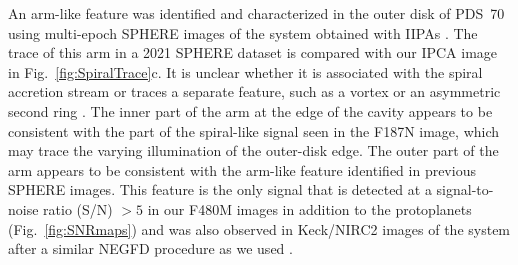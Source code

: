 \documentclass[longauth]{aa}
\begin{document}
An arm-like feature was %
identified and characterized in the outer disk of PDS~70 using multi-epoch SPHERE images of the system obtained with IIPAs \citep{Pairet2021, Juillard2022}. The trace of this arm in a 2021 SPHERE dataset is compared with our IPCA image in Fig.~\ref{fig:SpiralTrace}c.
It is unclear whether it is associated with the spiral accretion stream %
or traces a separate feature, such as a vortex or an asymmetric second ring \citep[][]{Juillard2022}. %
The inner part of the arm at the edge of the cavity appears to be consistent with the %
part of the spiral-like signal seen in the F187N image, which may trace the varying illumination of %
the outer-disk edge. The outer part of the arm appears to be consistent with the arm-like feature identified in previous SPHERE images. %
This %
feature %
is the only signal %
that is detected at a signal-to-noise ratio (S/N) $> 5$ in our F480M images in addition to the protoplanets (Fig.~\ref{fig:SNRmaps}) and was also observed in Keck/NIRC2 images of the system after a similar NEGFD procedure as we used \citep[Fig.~1 in][]{Wang2020}. 
\end{document}
